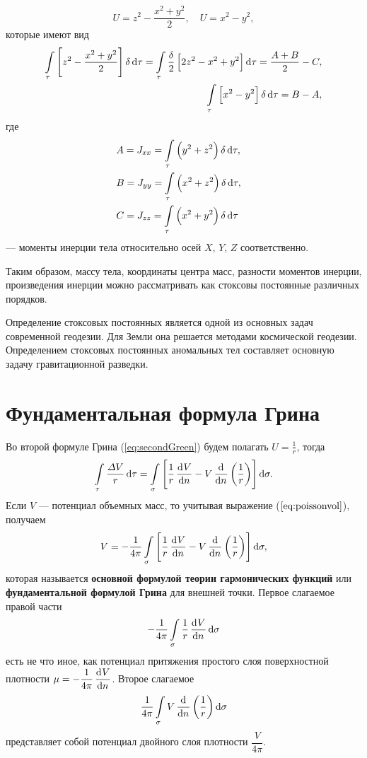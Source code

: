 \documentclass[11pt, a4paper]{article}
\theoremstyle{plain}
\theoremstyle{definition}
\theoremstyle{remark}
\begin{document}
\begin{equation*}
    U = z^2 - \dfrac{x^2 + y^2}{2},\quad U =  x^2 - y^2,
\end{equation*}
которые имеют вид
\begin{align*}
    \int\limits_{\tau} \left[ z^2 - \dfrac{x^2 + y^2}{2} \right] \delta \dif\tau =
    \int\limits_{\tau} \dfrac{\delta}{2} \left[ 2z^2 - x^2 + y^2 \right] \dif\tau =
    \dfrac{A + B}{2} - C,\\
    \int\limits_{\tau} \left[ x^2 - y^2 \right] \delta \dif\tau = B - A,
\end{align*}
где 
\begin{align*}
    &A = J_{xx} = \int\limits_{\tau} \left( y^2 + z^2 \right) \delta \dif\tau,\quad\\
    &B = J_{yy} = \int\limits_{\tau} \left( x^2 + z^2 \right) \delta \dif\tau,\quad\\
    &C = J_{zz} = \int\limits_{\tau} \left( x^2 + y^2 \right) \delta \dif\tau
\end{align*}
--- моменты инерции тела относительно осей $X$, $Y$, $Z$ соответственно.

Таким образом, массу тела, координаты центра масс, разности моментов инерции, произведения инерции
можно рассматривать как стоксовы постоянные различных порядков.

Определение стоксовых постоянных является одной из основных задач современной геодезии. Для Земли она
решается методами космической геодезии. Определением стоксовых постоянных аномальных тел составляет
основную задачу гравитационной разведки.

\section{Фундаментальная формула Грина}
Во второй формуле Грина (\ref{eq:secondGreen}) будем полагать $U = \frac{1}{r}$, тогда
\begin{equation}
    \int\limits_\tau \dfrac{\Delta V}{r} \dif\tau  = \int\limits_\sigma \left[
    \dfrac{1}{r}\dod{V}{n} - V\dod{}{n}\left( \frac{1}{r} \right)\right] \dif\sigma.
\end{equation}
Если $V$ --- потенциал объемных масс, то учитывая выражение ($\ref{eq:poissonvol}$), получаем
\begin{equation}
    \label{eq:fundamentalGreen}
    V  = -\dfrac{1}{4\pi}\int\limits_\sigma \left[
    \dfrac{1}{r}\dod{V}{n} - V\dod{}{n}\left( \frac{1}{r} \right)\right] \dif\sigma,
\end{equation}
которая называется \textbf{основной формулой теории гармонических функций} или \textbf{фундаментальной
формулой Грина} для внешней точки.
Первое слагаемое правой части 
\begin{equation*}
    -\dfrac{1}{4\pi}\int\limits_\sigma  \dfrac{1}{r}\dod{V}{n}  \dif\sigma
\end{equation*}
есть не что иное, как потенциал притяжения простого слоя поверхностной плотности $\mu =
-\dfrac{1}{4\pi}\dod{V}{n}$. Второе слагаемое
\begin{equation*}
    \dfrac{1}{4\pi}\int\limits_\sigma V\dod{}{n}\left( \frac{1}{r} \right)\dif\sigma
\end{equation*}
представляет собой потенциал двойного слоя плотности $\dfrac{V}{4\pi}$. 
\end{document}

